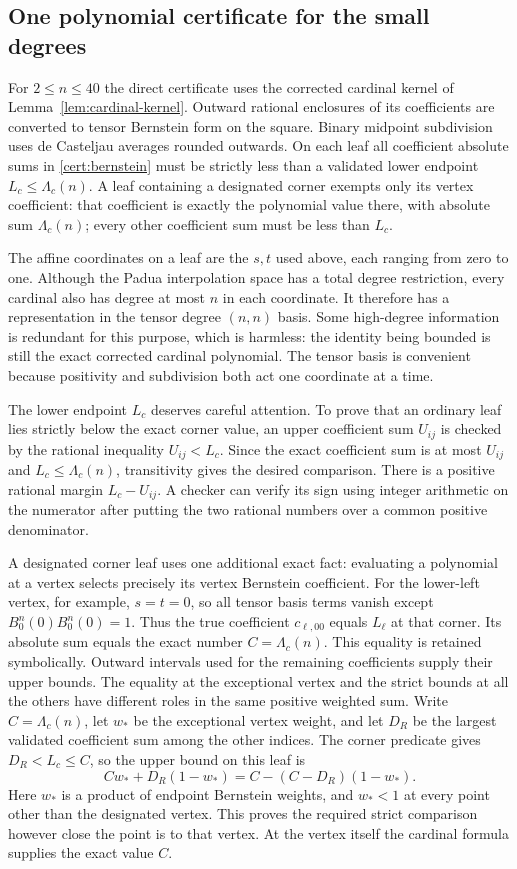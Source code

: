 \subsection{One polynomial certificate for the small degrees}
For $2\leq n\leq40$ the direct certificate uses the corrected cardinal
kernel of Lemma~\ref{lem:cardinal-kernel}. Outward rational enclosures of
its coefficients are converted to tensor Bernstein form on the square.
Binary midpoint subdivision uses de Casteljau averages rounded outwards. On each leaf
all coefficient absolute sums in \eqref{cert:bernstein} must be strictly
less than a validated lower endpoint $L_c\leq\Lambda_c(n)$.
A leaf containing a designated corner exempts only its vertex coefficient:
that coefficient is exactly the polynomial value there, with absolute sum
$\Lambda_c(n)$; every other coefficient sum must be less than $L_c$.

The affine coordinates on a leaf are the $s,t$ used above, each ranging
from zero to one. Although the Padua interpolation space has a total
degree restriction, every cardinal also has degree at most $n$ in each
coordinate. It therefore has a representation in the tensor degree
$(n,n)$ basis. Some high-degree information is redundant for this
purpose, which is harmless: the identity being bounded is still the
exact corrected cardinal polynomial. The tensor basis is convenient
because positivity and subdivision both act one coordinate at a time.

The lower endpoint $L_c$ deserves careful attention. To prove that an
ordinary leaf lies strictly below the exact corner value, an upper
coefficient sum $U_{ij}$ is checked by the rational inequality
$U_{ij}<L_c$. Since the exact coefficient sum is at most $U_{ij}$ and
$L_c\leq\Lambda_c(n)$, transitivity gives the desired comparison.
There is a positive rational margin $L_c-U_{ij}$. A checker can verify
its sign using integer arithmetic on the numerator after putting the
two rational numbers over a common positive denominator.

A designated corner leaf uses one additional exact fact: evaluating a
polynomial at a vertex selects precisely its vertex Bernstein
coefficient. For the lower-left vertex, for example, $s=t=0$, so all
tensor basis terms vanish except $B_0^n(0)B_0^n(0)=1$. Thus the true
coefficient $c_{\ell,00}$ equals $L_\ell$ at that corner. Its absolute
sum equals the exact number $C=\Lambda_c(n)$. This equality is retained
symbolically. Outward intervals used for the remaining coefficients
supply their upper bounds. The equality at the exceptional vertex and
the strict bounds at all the others have different roles in the same
positive weighted sum.
Write $C=\Lambda_c(n)$, let $w_*$ be the exceptional
vertex weight, and let $D_R$ be the largest validated coefficient sum
among the other indices. The corner predicate gives $D_R<L_c\leq C$,
so the upper bound on this leaf is
\[
 Cw_*+D_R(1-w_*)=C-(C-D_R)(1-w_*).
\]
Here $w_*$ is a product of endpoint Bernstein weights, and $w_*<1$
at every point other than the designated vertex. This proves the
required strict comparison however close the point is to that vertex.
At the vertex itself the cardinal formula supplies the exact value $C$.

